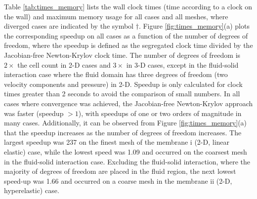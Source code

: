 \documentclass[sn-mathphys,Numbered]{sn-jnl}%
\begin{document}
Table \ref{tab:times_memory} lists the wall clock times (time according to a clock on the wall) and maximum memory usage for all cases and all meshes, where diverged cases are indicated by the symbol $\dag$.
Figure \ref{fig:times_memory}(a) plots the corresponding speedup on all cases as a function of the number of degrees of freedom, where the speedup is defined as the segregated clock time divided by the Jacobian-free Newton-Krylov clock time.
The number of degrees of freedom is $2 \times$ the cell count in 2-D cases and $3 \times$ in 3-D cases, except in the fluid-solid interaction case where the fluid domain has three degrees of freedom (two velocity components and pressure) in 2-D.
Speedup is only calculated for clock times greater than 2 seconds to avoid the comparison of small numbers.
In all cases where convergence was achieved, the Jacobian-free Newton-Krylov approach was faster (speedup $> 1$), with speedups of one or two orders of magnitude in many cases.
Additionally, it can be observed from Figure \ref{fig:times_memory}(a) that the speedup increases as the number of degrees of freedom increases.
The largest speedup was 237 on the finest mesh of the membrane i (2-D, linear elastic) case, while the lowest speed was 1.09 and occurred on the coarsest mesh in the fluid-solid interaction case.
Excluding the fluid-solid interaction, where the majority of degrees of freedom are placed in the fluid region, the next lowest speed-up was 1.66 and occurred on a coarse mesh in the membrane ii (2-D, hyperelastic) case.
\end{document}
